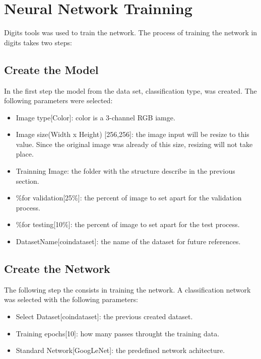 \documentclass[10pt,journal,compsoc]{IEEEtran}
\begin{document}
\section{Neural Network Trainning}

Digits tools was used to train the network. The process of training the network in digits takes two steps:

\subsection{Create the Model}

In the first step the model from the data set, classification type, was created. The following parameters were selected:

\begin{itemize}
\item Image type[Color]: color is a  3-channel RGB iamge.
\item Image size(Width x Height) [256,256]: the image input will be resize to this value. Since the original image was already of this size, resizing will not take place.
\item Trainning Image: the folder with the structure describe in the previous section. 
\item \%for validation[25\%]: the percent of image to set apart for the validation process.
\item \%for testing[10\%]: the percent of image to set apart for the test process.
\item DatasetName[coin\-dataset]: the name of the dataset for future references.
\end{itemize}

\subsection{Create the Network}

The following step the consists in training the network. A classification network was selected with the following parameters:

\begin{itemize}
\item Select Dataset[coin\-dataset]: the previous created dataset.
\item Training epochs[10]: how many passes throught the training data.
\item Standard Network[GoogLeNet]: the predefined network achitecture.
\end{itemize}
\end{document}
